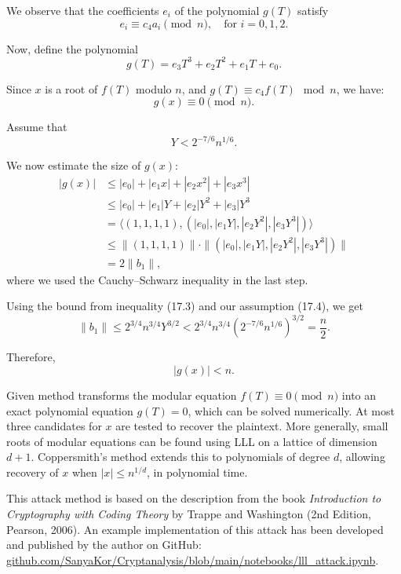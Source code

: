 \documentclass[a4paper,12pt]{article}
\begin{document}
We observe that the coefficients \( e_i \) of the polynomial \( g(T) \) satisfy
\[
e_i \equiv c_4 a_i \pmod{n}, \quad \text{for } i = 0, 1, 2.
\]

Now, define the polynomial
\[
g(T) = e_3 T^3 + e_2 T^2 + e_1 T + e_0.
\]

Since \( x \) is a root of \( f(T) \) modulo \( n \), and \( g(T) \equiv c_4 f(T) \mod n \), we have:
\[
g(x) \equiv 0 \pmod{n}.
\]

Assume that
\[
Y < 2^{-7/6} n^{1/6}. \tag{17.4}
\]

We now estimate the size of \( g(x) \):
\[
\begin{aligned}
|g(x)| &\leq |e_0| + |e_1 x| + |e_2 x^2| + |e_3 x^3| \\
       &\leq |e_0| + |e_1|Y + |e_2|Y^2 + |e_3|Y^3 \\
       &= \langle (1, 1, 1, 1), (|e_0|, |e_1 Y|, |e_2 Y^2|, |e_3 Y^3|) \rangle \\
       &\leq \|(1,1,1,1)\| \cdot \|(|e_0|, |e_1 Y|, |e_2 Y^2|, |e_3 Y^3|)\| \\
       &= 2 \|b_1\|,
\end{aligned}
\]
where we used the Cauchy–Schwarz inequality in the last step.

Using the bound from inequality (17.3) and our assumption (17.4), we get
\[
\|b_1\| \leq 2^{3/4} n^{3/4} Y^{3/2} < 2^{3/4} n^{3/4} \left(2^{-7/6} n^{1/6}\right)^{3/2} = \frac{n}{2}.
\]

Therefore,
\[
|g(x)| < n.
\]

Given method transforms the modular equation \( f(T) \equiv 0 \pmod{n} \) into an exact polynomial equation \( g(T) = 0 \), which can be solved numerically. At most three candidates for \( x \) are tested to recover the plaintext. More generally, small roots of modular equations can be found using LLL on a lattice of dimension \( d+1 \). Coppersmith's method extends this to polynomials of degree \( d \), allowing recovery of \( x \) when \( |x| \leq n^{1/d} \), in polynomial time.


 This attack method is based on the description from the book \textit{Introduction to Cryptography with Coding Theory} by Trappe and Washington (2nd Edition, Pearson, 2006). An example implementation of this attack has been developed and published by the author on GitHub: \href{https://github.com/SanyaKor/Cryptanalysis/blob/main/notebooks/lll\_attack.ipynb}{github.com/SanyaKor/Cryptanalysis/blob/main/notebooks/lll\_attack.ipynb}.
\newpage

\end{document}
